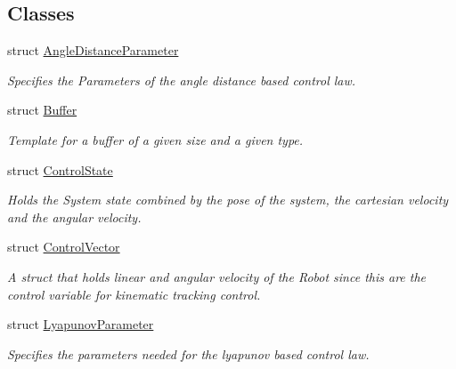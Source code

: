 \subsection*{Classes}
\begin{DoxyCompactItemize}
\item 
struct \hyperlink{structController_1_1AngleDistanceParameter}{Angle\+Distance\+Parameter}
\begin{DoxyCompactList}\small\item\em Specifies the Parameters of the angle distance based control law. \end{DoxyCompactList}\item 
struct \hyperlink{structController_1_1Buffer}{Buffer}
\begin{DoxyCompactList}\small\item\em Template for a buffer of a given size and a given type. \end{DoxyCompactList}\item 
struct \hyperlink{structController_1_1ControlState}{Control\+State}
\begin{DoxyCompactList}\small\item\em Holds the System state combined by the pose of the system, the cartesian velocity and the angular velocity. \end{DoxyCompactList}\item 
struct \hyperlink{structController_1_1ControlVector}{Control\+Vector}
\begin{DoxyCompactList}\small\item\em A struct that holds linear and angular velocity of the Robot since this are the control variable for kinematic tracking control. \end{DoxyCompactList}\item 
struct \hyperlink{structController_1_1LyapunovParameter}{Lyapunov\+Parameter}
\begin{DoxyCompactList}\small\item\em Specifies the parameters needed for the lyapunov based control law. \end{DoxyCompactList}\end{DoxyCompactItemize}
